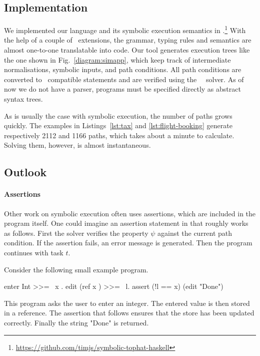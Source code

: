 \subsection{Implementation}

We implemented our language and its symbolic execution semantics in \HASKELL.\footnote{\url{https://github.com/timjs/symbolic-tophat-haskell}}
With the help of a couple of \GHC\ extensions, the grammar, typing rules and semantics are almost one-to-one translatable into code.
Our tool generates execution trees like the one shown in Fig.~\ref{diagram:simapp},
which keep track of intermediate normalisations, symbolic inputs, and path conditions.
All path conditions are converted to \SMTLIB\ compatible statements and are verified using the \ZTHREE\ \SMT~solver.
As of now we do not have a parser, programs must be specified directly as abstract syntax trees.

As is usually the case with symbolic execution, the number of paths grows quickly.
The examples in Listings~\ref{lst:tax} and \ref{lst:flight-booking} generate respectively 2112 and 1166 paths,
which takes about a minute to calculate.
Solving them, however, is almost instantaneous.



\subsection{Outlook}
\label{subsec:outlook}

\paragraph{Assertions}

Other work on symbolic execution often uses assertions, which are included in the program itself.
One could imagine an assertion statement  in \TOPHAT that roughly works as follows.
First the \SMT solver verifies the property $\psi$ against the current path condition.
If the assertion fails, an error message is generated.
Then the program continues with task $t$.

\begin{example}
  Consider the following small example program.
  \begin{TASK}
    enter Int >>= \ x . edit (ref x ) >>= \ l. assert (!l == x) (edit "Done")
  \end{TASK}

  This program asks the user to enter an integer.
  The entered value is then stored in a reference.
  The assertion that follows ensures that the store has been updated correctly.
  Finally the string "Done" is returned.
\end{example}

